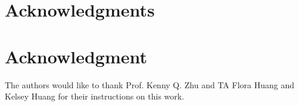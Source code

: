 \documentclass[10pt,journal,compsoc]{IEEEtran}
\begin{document}
\ifCLASSOPTIONcompsoc
  \section*{Acknowledgments}
\else
  \section*{Acknowledgment}
\fi


The authors would like to thank Prof. Kenny Q. Zhu and TA Flora Huang and Kelsey Huang for their instructions on this work.


\ifCLASSOPTIONcaptionsoff
  \newpage
\fi





%
%
%

% 
\end{document}
